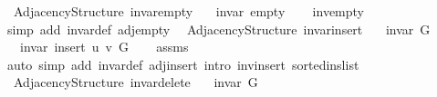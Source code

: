 \begin{isabellebody}
\endisatagproof
{\isafoldproof}%
%
\isadelimproof
\isanewline
%
\endisadelimproof
%
\isadeliminvisible
\isanewline
%
\endisadeliminvisible
%
\isataginvisible
{}\isamarkupfalse%
\ {\isacharparenleft}{\kern0pt}\ Adjacency{\isacharunderscore}{\kern0pt}Structure{\isacharparenright}{\kern0pt}\ invar{\isacharunderscore}{\kern0pt}empty{\isacharcolon}{\kern0pt}\isanewline
\ \ \ {\isachardoublequoteopen}invar\ empty{\isachardoublequoteclose}%
\endisataginvisible
{\isafoldinvisible}%
%
\isadeliminvisible
\isanewline
%
\endisadeliminvisible
%
\isadelimproof
\ \ %
\endisadelimproof
%
\isatagproof
{}\isamarkupfalse%
\ inv{\isacharunderscore}{\kern0pt}empty\isanewline
\ \ \isamarkupfalse%
\ {\isacharparenleft}{\kern0pt}simp\ add{\isacharcolon}{\kern0pt}\ invar{\isacharunderscore}{\kern0pt}def\ adj{\isacharunderscore}{\kern0pt}empty{\isacharparenright}{\kern0pt}%
\endisatagproof
{\isafoldproof}%
%
\isadelimproof
\isanewline
%
\endisadelimproof
%
\isadeliminvisible
\isanewline
%
\endisadeliminvisible
%
\isataginvisible
{}\isamarkupfalse%
\ {\isacharparenleft}{\kern0pt}\ Adjacency{\isacharunderscore}{\kern0pt}Structure{\isacharparenright}{\kern0pt}\ invar{\isacharunderscore}{\kern0pt}insert{\isacharcolon}{\kern0pt}\isanewline
\ \ \ {\isachardoublequoteopen}invar\ G{\isachardoublequoteclose}\isanewline
\ \ \ {\isachardoublequoteopen}invar\ {\isacharparenleft}{\kern0pt}insert\ u\ v\ G{\isacharparenright}{\kern0pt}{\isachardoublequoteclose}%
\endisataginvisible
{\isafoldinvisible}%
%
\isadeliminvisible
\isanewline
%
\endisadeliminvisible
%
\isadelimproof
\ \ %
\endisadelimproof
%
\isatagproof
{}\isamarkupfalse%
\ assms\isanewline
\ \ \isamarkupfalse%
\ {\isacharparenleft}{\kern0pt}auto\ simp\ add{\isacharcolon}{\kern0pt}\ invar{\isacharunderscore}{\kern0pt}def\ adj{\isacharunderscore}{\kern0pt}insert\ intro{\isacharcolon}{\kern0pt}\ inv{\isacharunderscore}{\kern0pt}insert\ sorted{\isacharunderscore}{\kern0pt}ins{\isacharunderscore}{\kern0pt}list{\isacharparenright}{\kern0pt}%
\endisatagproof
{\isafoldproof}%
%
\isadelimproof
\isanewline
%
\endisadelimproof
%
\isadeliminvisible
\isanewline
%
\endisadeliminvisible
%
\isataginvisible
{}\isamarkupfalse%
\ {\isacharparenleft}{\kern0pt}\ Adjacency{\isacharunderscore}{\kern0pt}Structure{\isacharparenright}{\kern0pt}\ invar{\isacharunderscore}{\kern0pt}delete{\isacharcolon}{\kern0pt}\isanewline
\ \ \ {\isachardoublequoteopen}invar\ G{\isachardoublequoteclose}\isanewline

\end{isabellebody}
